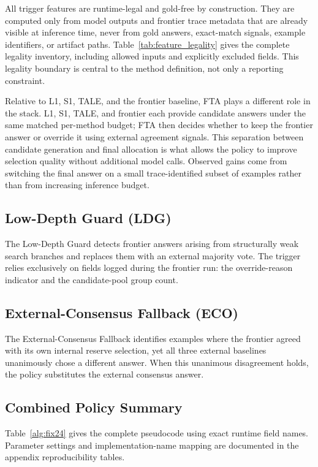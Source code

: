 \documentclass[smallcondensed]{svjour3}
\begin{document}
All trigger features are runtime-legal and gold-free by construction.
They are computed only from model outputs and frontier trace metadata that are
already visible at inference time, never from gold answers, exact-match
signals, example identifiers, or artifact paths.
Table~\ref{tab:feature_legality} gives the complete legality inventory,
including allowed inputs and explicitly excluded fields.
This legality boundary is central to the method definition, not only a
reporting constraint.

Relative to L1, S1, TALE, and the frontier baseline, FTA plays a different
role in the stack.
L1, S1, TALE, and frontier each provide candidate answers under the same
matched per-method budget; FTA then decides whether to keep the frontier
answer or override it using external agreement signals.
This separation between candidate generation and final allocation is what
allows the policy to improve selection quality without additional model calls.
Observed gains come from switching the final answer on a small
trace-identified subset of examples rather than from increasing inference
budget.

\subsection{Low-Depth Guard (LDG)}
\label{sec:fix2}

The Low-Depth Guard detects frontier answers arising from structurally weak
search branches and replaces them with an external majority vote.
The trigger relies exclusively on fields logged during the frontier run:
the override-reason indicator and the candidate-pool group count.

\subsection{External-Consensus Fallback (ECO)}
\label{sec:fix4}

The External-Consensus Fallback identifies examples where the frontier agreed
with its own internal reserve selection, yet all three external baselines
unanimously chose a different answer.
When this unanimous disagreement holds, the policy substitutes the external
consensus answer.

\subsection{Combined Policy Summary}
\label{sec:fix24_algorithm}

Table~\ref{alg:fix24} gives the complete pseudocode using exact runtime field
names.
Parameter settings and implementation-name mapping are documented in the
appendix reproducibility tables.
\end{document}
